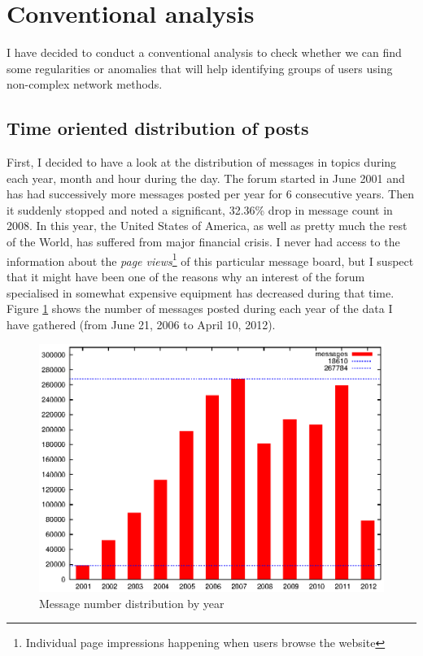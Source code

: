 \section{Conventional analysis}

  I have decided to conduct a conventional analysis to check whether we can find some regularities or anomalies that will help identifying groups of users using non-complex network methods.
  
  \subsection{Time oriented distribution of posts}
  
    First, I decided to have a look at the distribution of messages in topics during each year, month and hour during the day. The forum started in June 2001 and has had successively more messages posted per year for 6 consecutive years. Then it suddenly stopped and noted a significant, 32.36\% drop in message count in 2008. In this year, the United States of America, as well as pretty much the rest of the World, has suffered from major financial crisis. I never had access to the information about the \emph{page views}\footnote{Individual page impressions happening when users browse the website} of this particular message board, but I suspect that it might have been one of the reasons why an interest of the forum specialised in somewhat expensive equipment has decreased during that time. Figure \ref{fig:dist_year} shows the number of messages posted during each year of the data I have gathered (from June 21, 2006 to April 10, 2012).
    
    \begin{figure}[H]
      \centering
      \includegraphics[width=\textwidth]{chapters/03_implementation/yearly}
      \caption{Message number distribution by year}
      \label{fig:dist_year}
    \end{figure}
    
